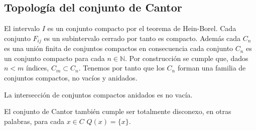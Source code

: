 \subsection*{Topología del conjunto de Cantor}

El intervalo $I$ es un conjunto compacto por el teorema de Hein-Borel. Cada conjunto $F_{ij}$ es un subintervalo cerrado por tanto es compacto. Además cada $C_n$ es una unión finita de conjuntos compactos en consecuencia cada conjunto $C_n$ es un conjunto compacto para cada $n \in \mathbb{N}$. Por construcción se cumple que, dados $n < m $ índices, $C_m \subset C_n$. Tenemos por tanto que los $C_n$ forman una familia de conjuntos compactos, no vacíos y anidados. 

\begin{lm}
La intersección de conjuntos compactos anidados es no vacía. 
\end{lm} 

El conjunto de Cantor también cumple ser totalmente disconexo, en otras palabras, para cada $x \in C$ $Q(x)=\{x\}$. 
 
 
